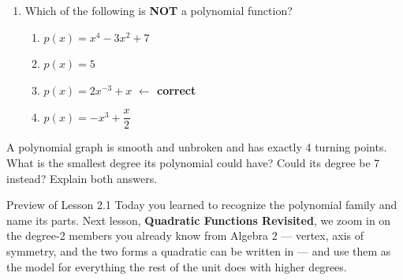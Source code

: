 \documentclass[10pt]{article}
\begin{document}
\begin{enumerate}[itemsep=10pt]
\item Which of the following is \textbf{NOT} a polynomial function?

\begin{enumerate}[label=\Alph*., itemsep=3pt]
  \item $p(x) = x^4 - 3x^2 + 7$
  \item $p(x) = 5$
  \item $p(x) = 2x^{-3} + x$ \textcolor{keyred}{\textbf{$\leftarrow$ correct}}
  \item $p(x) = -x^3 + \dfrac{x}{2}$
\end{enumerate}

\end{enumerate}

\vspace{0.1in}

\boxguard
\begin{extensionbox}
A polynomial graph is smooth and unbroken and has exactly 4 turning points. What is
the smallest degree its polynomial could have? Could its degree be 7 instead?
Explain both answers.

\vspace{0.05in}
\end{extensionbox}

\vspace{0.1in}

\boxguard
\begin{notesbox}{Preview of Lesson 2.1}
Today you learned to recognize the polynomial family and name its parts. Next
lesson, \textbf{Quadratic Functions Revisited}, we zoom in on the degree-2 members
you already know from Algebra 2 --- vertex, axis of symmetry, and the two forms a
quadratic can be written in --- and use them as the model for everything the rest
of the unit does with higher degrees.
\end{notesbox}
\end{document}

